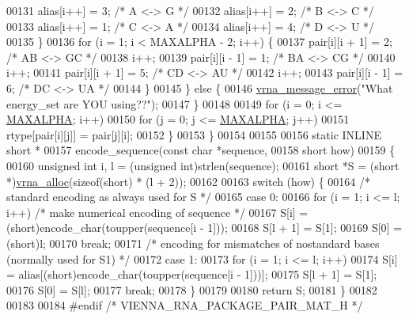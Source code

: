 \begin{DoxyCode}
00131         alias[i++]  = 3;    \textcolor{comment}{/* A <-> G */}
00132         alias[i++]  = 2;    \textcolor{comment}{/* B <-> C */}
00133         alias[i++]  = 1;    \textcolor{comment}{/* C <-> A */}
00134         alias[i++]  = 4;    \textcolor{comment}{/* D <-> U */}
00135       \}
00136       \textcolor{keywordflow}{for} (i = 1; i < MAXALPHA - 2; i++) \{
00137         pair[i][i + 1] = 2;     \textcolor{comment}{/* AB <-> GC */}
00138         i++;
00139         pair[i][i - 1] = 1;     \textcolor{comment}{/* BA <-> CG */}
00140         i++;
00141         pair[i][i + 1] = 5;     \textcolor{comment}{/* CD <-> AU */}
00142         i++;
00143         pair[i][i - 1] = 6;     \textcolor{comment}{/* DC <-> UA */}
00144       \}
00145     \} \textcolor{keywordflow}{else} \{
00146       \hyperlink{group__utils_ga36b35be01d7f36cf7f59c245eee628d1}{vrna\_message\_error}(\textcolor{stringliteral}{"What energy\_set are YOU using??"});
00147     \}
00148 
00149     \textcolor{keywordflow}{for} (i = 0; i <= \hyperlink{group__model__details_ga05a5ffe718aa431d97419a12fb082379}{MAXALPHA}; i++)
00150       \textcolor{keywordflow}{for} (j = 0; j <= \hyperlink{group__model__details_ga05a5ffe718aa431d97419a12fb082379}{MAXALPHA}; j++)
00151         rtype[pair[i][j]] = pair[j][i];
00152   \}
00153 \}
00154 
00155 
00156 \textcolor{keyword}{static} INLINE \textcolor{keywordtype}{short} *
00157 encode\_sequence(\textcolor{keyword}{const} \textcolor{keywordtype}{char}  *sequence,
00158                 \textcolor{keywordtype}{short}       how)
00159 \{
00160   \textcolor{keywordtype}{unsigned} \textcolor{keywordtype}{int}  i, l = (\textcolor{keywordtype}{unsigned} int)strlen(sequence);
00161   \textcolor{keywordtype}{short}         *S = (\textcolor{keywordtype}{short} *)\hyperlink{group__utils_gaf37a0979367c977edfb9da6614eebe99}{vrna\_alloc}(\textcolor{keyword}{sizeof}(\textcolor{keywordtype}{short}) * (l + 2));
00162 
00163   \textcolor{keywordflow}{switch} (how) \{
00164     \textcolor{comment}{/* standard encoding as always used for S */}
00165     \textcolor{keywordflow}{case} 0:
00166       \textcolor{keywordflow}{for} (i = 1; i <= l; i++)    \textcolor{comment}{/* make numerical encoding of sequence */}
00167         S[i] = (\textcolor{keywordtype}{short})encode\_char(toupper(sequence[i - 1]));
00168       S[l + 1]  = S[1];
00169       S[0]      = (short)l;
00170       \textcolor{keywordflow}{break};
00171     \textcolor{comment}{/* encoding for mismatches of nostandard bases (normally used for S1) */}
00172     \textcolor{keywordflow}{case} 1:
00173       \textcolor{keywordflow}{for} (i = 1; i <= l; i++)
00174         S[i] = alias[(\textcolor{keywordtype}{short})encode\_char(toupper(sequence[i - 1]))];
00175       S[l + 1]  = S[1];
00176       S[0]      = S[l];
00177       \textcolor{keywordflow}{break};
00178   \}
00179 
00180   \textcolor{keywordflow}{return} S;
00181 \}
00182 
00183 
00184 \textcolor{preprocessor}{#endif }\textcolor{comment}{/* VIENNA\_RNA\_PACKAGE\_PAIR\_MAT\_H */}\textcolor{preprocessor}{}
\end{DoxyCode}
